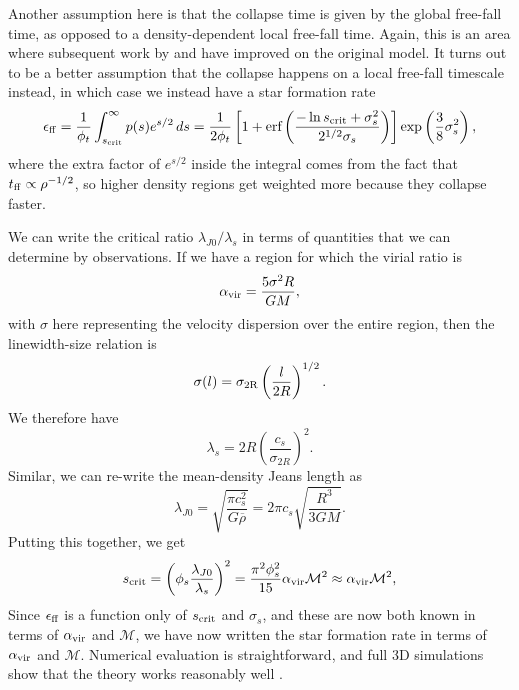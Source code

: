 Another assumption here is that the collapse time is given by the global free-fall time, as opposed to a density-dependent local free-fall time. Again, this is an area where subsequent work by \citet{hennebelle11b} and \citet{federrath12a} have improved on the original model. It turns out to be a better assumption that the collapse happens on a local free-fall timescale instead, in which case we instead have a star formation rate
\begin{equation}
\epsilon_{\rm ff} = \frac{1}{\phi_t} \int_{s_{\rm crit}}^\infty p(s) e^{s/2} \, ds
= \frac{1}{2\phi_t} \left[1+\mbox{erf}\left(\frac{-\ln s_{\rm crit}+\sigma_s^2}{2^{1/2}\sigma_s}\right)\right] \exp\left(\frac{3}{8}\sigma_s^2\right),
\end{equation}
where the extra factor of $e^{s/2}$ inside the integral comes from the fact that $t_{\rm ff} \propto \rho^{-1/2}$, so higher density regions get weighted more because they collapse faster.

We can write the critical ratio $\lambda_{J0}/\lambda_s$ in terms of quantities that we can determine by observations. If we have a region for which the virial ratio is
\begin{equation}
\alpha_{\mathrm{vir}} = \frac{5\sigma^2 R}{GM},
\end{equation}
with $\sigma$ here representing the velocity dispersion over the entire region, then the linewidth-size relation is
\begin{equation}
\sigma(l) = \sigma_{\rm 2R} \left(\frac{l}{2R}\right)^{1/2}.
\end{equation}
We therefore have
\begin{equation}
\lambda_s = 2R \left(\frac{c_s}{\sigma_{2R}}\right)^2.
\end{equation}
Similar, we can re-write the mean-density Jeans length as
\begin{equation}
\lambda_{J0} = \sqrt{\frac{\pi c_s^2}{G\overline{\rho}}} = 2\pi c_s \sqrt{\frac{R^3}{3 GM}}.
\end{equation}
Putting this together, we get
\begin{equation}
s_{\rm crit} = \left(\phi_s \frac{\lambda_{J0}}{\lambda_s}\right)^2 = \frac{\pi^2 \phi_s^2}{15} \alpha_{\mathrm{vir}} \mathcal{M}^2 \approx \alpha_{\mathrm{vir}} \mathcal{M}^2,
\end{equation}
Since $\epsilon_{\rm ff}$ is a function only of $s_{\rm crit}$ and $\sigma_s$, and these are now both known in terms of $\alpha_{\mathrm{vir}}$ and $\mathcal{M}$, we have now written the star formation rate in terms of $\alpha_{\mathrm{vir}}$ and $\mathcal{M}$. Numerical evaluation is straightforward, and full 3D simulations show that the theory works reasonably well \citep{federrath12a}. 

